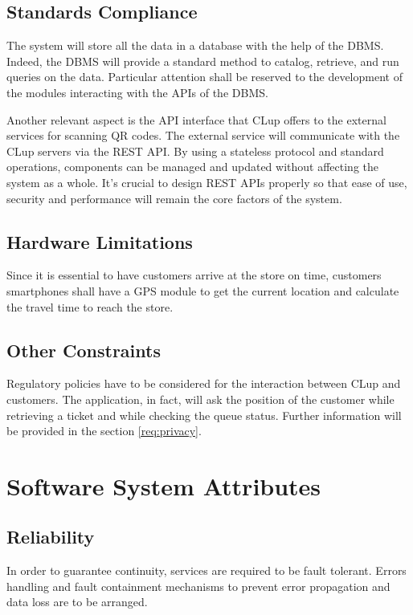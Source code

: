\subsection{Standards Compliance}
The system will store all the data in a database with the help of the DBMS. Indeed, the DBMS will provide a standard method to catalog, retrieve, and run queries on the data. Particular attention shall be reserved to the development of the modules interacting with the APIs of the DBMS.

Another relevant aspect is the API interface that CLup offers to the external services for scanning QR codes. The external service will communicate with the CLup servers via the REST API. By using a stateless protocol and standard operations, components can be managed and updated without affecting the system as a whole.\newline
It’s crucial to design REST APIs properly so that ease of use, security and performance will remain the core factors of the system.

\subsection{Hardware Limitations}
Since it is essential to have customers arrive at the store on time, customers smartphones shall have a GPS module to get the current location and calculate the travel time to reach the store.

\subsection{Other Constraints}
Regulatory policies have to be considered for the interaction between CLup
and customers. The application, in fact, will ask the position of
the customer while retrieving a ticket and while checking the queue status. Further information will be provided in the section \ref{req:privacy}.

\section{Software System Attributes}

\subsection{Reliability}
In order to guarantee continuity, services are required to be fault tolerant. Errors handling and fault containment mechanisms to prevent error propagation and data loss are to be arranged.

